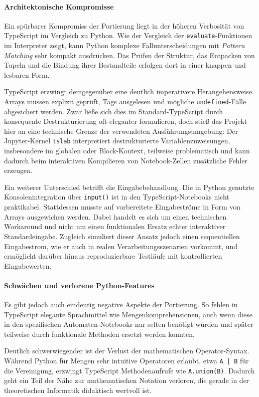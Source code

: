 \paragraph{Architektonische Kompromisse}
Ein spürbarer Kompromiss der Portierung liegt in der höheren Verbosität von TypeScript im Vergleich zu Python. Wie der Vergleich der \texttt{evaluate}-Funktionen im Interpreter zeigt, kann Python komplexe Fallunterscheidungen mit \textit{Pattern Matching} sehr kompakt ausdrücken. Das Prüfen der Struktur, das Entpacken von Tupeln und die Bindung ihrer Bestandteile erfolgen dort in einer knappen und lesbaren Form.

TypeScript erzwingt demgegenüber eine deutlich imperativere Herangehensweise. Arrays müssen explizit geprüft, Tags ausgelesen und mögliche \texttt{undefined}-Fälle abgesichert werden. Zwar ließe sich dies im Standard-TypeScript durch konsequente Destrukturierung oft eleganter formulieren, doch stieß das Projekt hier an eine technische Grenze der verwendeten Ausführungsumgebung: Der Jupyter-Kernel \texttt{tslab} interpretiert destrukturierte Variablenzuweisungen, insbesondere im globalen oder Block-Kontext, teilweise problematisch und kann dadurch beim interaktiven Kompilieren von Notebook-Zellen zusätzliche Fehler erzeugen.

Ein weiterer Unterschied betrifft die Eingabebehandlung. Die in Python genutzte Konsolenintegration über \texttt{input()} ist in den TypeScript-Notebooks nicht praktikabel. Stattdessen musste auf vorbereitete Eingabeströme in Form von Arrays ausgewichen werden. Dabei handelt es sich um einen technischen Workaround und nicht um einen funktionalen Ersatz echter interaktiver Standardeingabe. Zugleich simuliert dieser Ansatz jedoch einen sequentiellen Eingabestrom, wie er auch in realen Verarbeitungsszenarien vorkommt, und ermöglicht darüber hinaus reproduzierbare Testläufe mit kontrollierten Eingabewerten.

\paragraph{Schwächen und verlorene Python-Features}
Es gibt jedoch auch eindeutig negative Aspekte der Portierung. So fehlen in TypeScript elegante Sprachmittel wie Mengenkomprehensionen, auch wenn diese in den spezifischen Automaten-Notebooks nur selten benötigt wurden und später teilweise durch funktionale Methoden ersetzt werden konnten.

Deutlich schwerwiegender ist der Verlust der mathematischen Operator-Syntax. Während Python für Mengen sehr intuitive Operatoren erlaubt, etwa \texttt{A | B} für die Vereinigung, erzwingt TypeScript Methodenaufrufe wie \texttt{A.union(B)}. Dadurch geht ein Teil der Nähe zur mathematischen Notation verloren, die gerade in der theoretischen Informatik didaktisch wertvoll ist.

